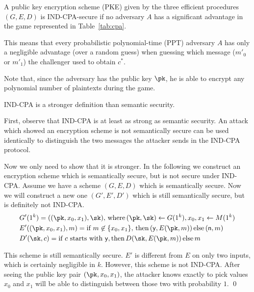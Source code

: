 \documentclass[12pt]{tufte-book}
\begin{document}
\begin{definition}
A public key encryption scheme (PKE) given by the three efficient procedures $(G,E,D)$ is
IND-CPA-secure if no adversary $A$ has a significant advantage in the game
represented in Table~\ref{tab:cpa}.

This means that every probabilistic polynomial-time (PPT) adversary $A$ has only a
negligible advantage (over a random guess)
when guessing which message ($m'_0$ or $m'_1$) the challenger used to
obtain $c^*$.

Note that, since the adversary has the public key $\pk$, he is able to encrypt any
polynomial number of plaintexts during the game.
\end{definition}


\begin{theorem}
IND-CPA is a stronger definition than semantic security.
\end{theorem}

\proof
First, observe that IND-CPA is at least as strong as semantic security. An
attack which showed an encryption scheme is not semantically secure can be used
identically to distinguish the two messages the attacker sends in the IND-CPA protocol.

Now we only need to show that it is stronger.
In the following we construct an encryption scheme which is semantically secure, but is not secure
under IND-CPA.
Assume we have
a scheme $(G, E, D)$ which is semantically secure. Now we will construct a new one
$(G', E', D')$ which  is still semantically secure, but is definitely not IND-CPA.
\begin{align*}
& G'(1^k) = ((\pk, x_0, x_1), \sk), \,\text{where}\, (\pk,\sk) \gets G(1^k), x_0, x_1 \gets M(1^k) \\
& E'((\pk, x_0, x_1), m) = \text{if } m \not\in\{x_0,x_1\}, \,\text{then}\, (\mathsf{y},E(\pk,m)) \,\text{else}\, (\mathsf{n},m) \\
& D'(\sk, c) = \text{if } c \text{ starts with } \mathsf{y}, \text{then}\, D(\sk,E(\pk,m)) \,\text{else}\, m 
\end{align*}

This scheme is still semantically secure. $E'$ is different from $E$ on only two
inputs, which is certainly negligible in $k$. However, this
scheme is not IND-CPA. After seeing the public key pair $(\pk, x_0, x_1)$, the attacker
knows exactly to pick values $x_0$ and $x_1$ will be able to distinguish between
those two with probability $1$. \qed


\iffalse
\end{document}

